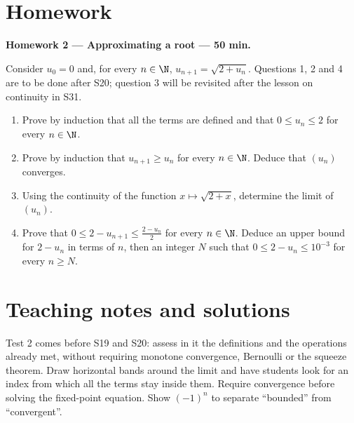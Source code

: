 \mxnewpage
\section{Homework}\textbf{Homework 2 --- Approximating a root --- 50 min.}\par Consider $u_0=0$ and, for every $n\in\N$, $u_{n+1}=\sqrt{2+u_n}$. Questions 1, 2 and 4 are to be done after S20; question 3 will be revisited after the lesson on continuity in S31.
\begin{enumerate}\item Prove by induction that all the terms are defined and that $0\le u_n\le2$ for every $n\in\N$.
\item Prove by induction that $u_{n+1}\ge u_n$ for every $n\in\N$. Deduce that $(u_n)$ converges.
\item Using the continuity of the function $x\mapsto\sqrt{2+x}$, determine the limit of $(u_n)$.
\item Prove that $0\le2-u_{n+1}\le\frac{2-u_n}{2}$ for every $n\in\N$. Deduce an upper bound for $2-u_n$ in terms of $n$, then an integer $N$ such that $0\le2-u_n\le10^{-3}$ for every $n\ge N$.\end{enumerate}

\ifmxteacher\mxnewpage\section{Teaching notes and solutions}\begin{teachernote}Test 2 comes before S19 and S20: assess in it the definitions and the operations already met, without requiring monotone convergence, Bernoulli or the squeeze theorem. Draw horizontal bands around the limit and have students look for an index from which all the terms stay inside them. Require convergence before solving the fixed-point equation. Show $(-1)^n$ to separate ``bounded'' from ``convergent''.\end{teachernote}

